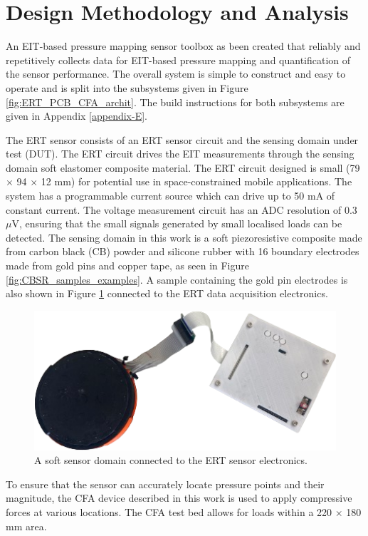 \section{Design Methodology and Analysis} 
An EIT-based pressure mapping sensor toolbox as been created that reliably and repetitively collects data for EIT-based pressure mapping and quantification of the sensor performance. The overall system is simple to construct and easy to operate and is split into the subsystems given in Figure \ref{fig:ERT_PCB_CFA_archit}. The build instructions for both subsystems are given in Appendix \ref{appendix-E}.

The ERT sensor consists of an ERT sensor circuit and the sensing domain under test (DUT). The ERT circuit drives the EIT measurements through the sensing domain soft elastomer composite material. The ERT circuit designed is small (79 $\times$ 94 $\times$ 12 mm) for potential use in space-constrained mobile applications. 
The system has a programmable current source which can drive up to 50 mA of constant current. The voltage measurement circuit has an ADC resolution of 0.3 $\mu$V, ensuring that the small signals generated by small localised loads can be detected. The sensing domain in this work is a soft piezoresistive composite made from carbon black (CB) powder and silicone rubber with 16 boundary electrodes made from gold pins and copper tape, as seen in Figure \ref{fig:CBSR_samples_examples}. A sample containing the gold pin electrodes is also shown in Figure \ref{fig:ert_sensor} connected to the ERT data acquisition electronics.
\begin{figure}[H]
	\centering
	\includegraphics[width=0.6\linewidth]{Figures/ert_pcb_and_DUT.png}
	\caption{A soft sensor domain connected to the ERT sensor electronics.}
	\label{fig:ert_sensor}
\end{figure}
To ensure that the sensor can accurately locate pressure points and their magnitude, the CFA device described in this work is used to apply compressive forces at various locations. The CFA test bed allows for loads within a 220 $\times$ 180 mm area.
